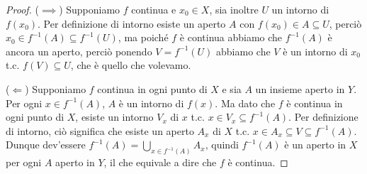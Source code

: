 \begin{proof}
	($\implies$) Supponiamo $f$ continua e $x_0 \in X$, sia inoltre $U$ un
	intorno di $f(x_0)$. Per definizione di intorno esiste un aperto $A$ con
	$f(x_0) \in A \subseteq U$, perciò $x_0 \in f^{-1}(A) \subseteq f^{-1}(U)$,
	ma poiché $f$ è continua abbiamo che $f^{-1}(A)$ è ancora un aperto, perciò
	ponendo $V=f^{-1}(U)$ abbiamo che $V$ è un intorno di $x_0$ t.c. $f(V)
	\subseteq U$, che è quello che volevamo.

	($\Leftarrow$) Supponiamo $f$ continua in ogni punto di $X$ e sia $A$ un
	insieme aperto in $Y$. Per ogni $x \in f^{-1}(A)$, $A$ è un intorno di
	$f(x)$. Ma dato che $f$ è continua in ogni punto di $X$, esiste un intorno
	$V_x$ di $x$ t.c. $x \in V_x \subseteq f^{-1}(A)$. Per definizione di
	intorno, ciò significa che esiste un aperto $A_x$ di $X$ t.c. $x \in A_x
	\subseteq V \subseteq f^{-1}(A)$. Dunque dev'essere $\displaystyle
	f^{-1}(A)= \bigcup_{x \in f^{-1}(A)} A_x$,
	quindi $f^{-1}(A)$ è un aperto in $X$ per ogni $A$ aperto in $Y$, il che
	equivale a dire che $f$ è continua.
\end{proof}
